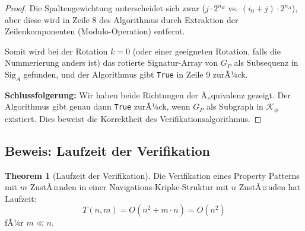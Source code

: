 ﻿\documentclass[a4paper,12pt]{article}
\theoremstyle{definition}
\newtheorem{theorem}{Theorem}[section]
\begin{document}
\begin{proof}
Die Spaltengewichtung unterscheidet sich zwar ($j \cdot 2^{n_B}$ vs. $(i_0+j) \cdot 2^{n_A}$), aber diese wird in Zeile 8 des Algorithmus durch Extraktion der Zeilenkomponenten (Modulo-Operation) entfernt.

Somit wird bei der Rotation $k=0$ (oder einer geeigneten Rotation, falls die Nummerierung anders ist) das rotierte Signatur-Array von $G_P$ als Subsequenz in $\text{Sig}_A$ gefunden, und der Algorithmus gibt \texttt{True} in Zeile 9 zurÃ¼ck.

\textbf{Schlussfolgerung:} Wir haben beide Richtungen der Ã„quivalenz gezeigt. Der Algorithmus gibt genau dann \texttt{True} zurÃ¼ck, wenn $G_P$ als Subgraph in $\mathcal{K}_{\phi}$ existiert. Dies beweist die Korrektheit des Verifikationsalgorithmus.
\end{proof}

\subsection{Beweis: Laufzeit der Verifikation}

\begin{theorem}[Laufzeit der Verifikation]
Die Verifikation eines Property Patterns mit $m$ ZustÃ¤nden in einer Navigations-Kripke-Struktur mit $n$ ZustÃ¤nden hat Laufzeit:
\[
T(n,m) = O(n^2 + m \cdot n) = O(n^2)
\]
fÃ¼r $m \ll n$.
\end{theorem}
\end{document}
